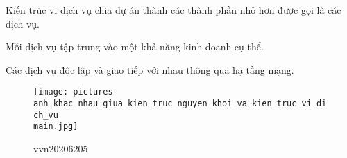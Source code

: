 Kiến trúc vi dịch vụ chia dự án thành các thành phần nhỏ hơn được gọi là các dịch vụ.

Mỗi dịch vụ tập trung vào một khả năng kinh doanh cụ thể.

Các dịch vụ độc lập và giao tiếp với nhau thông qua hạ tầng mạng.

%


\begin{figure}[h]
    \centering
    \texttt{[image: pictures\\anh\_khac\_nhau\_giua\_kien\_truc\_nguyen\_khoi\_va\_kien\_truc\_vi\_dich\_vu\\main.jpg]}
    \caption{vvn20206205}
    \label{pictures:anh_khac_nhau_giua_kien_truc_nguyen_khoi_va_kien_truc_vi_dich_vu\main.jpg}
    \end{figure}
%





